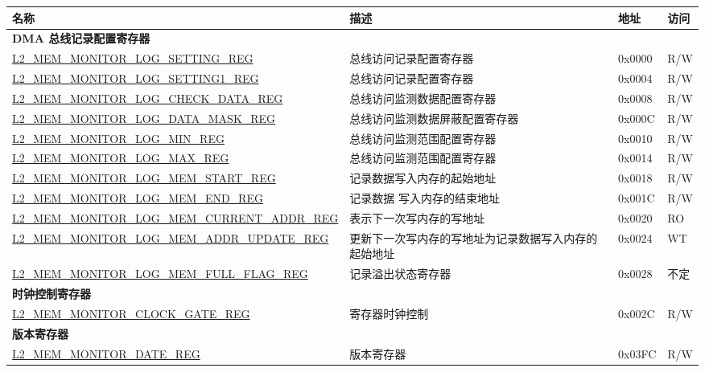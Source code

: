 \begin{longtable}{ | l| m{5cm} | l | l | }
\hline\rowcolor{lightgray}
{\bfseries 名称} & {\bfseries 描述} &  {\bfseries 地址} & {\bfseries 访问} \\ \hline
\endhead
\multicolumn{4}{|l|}{\textbf{DMA 总线记录配置寄存器}} \\ \hline
\hyperref[regdesc:L2MEMMONITORLOGSETTINGREG]{L2\_MEM\_MONITOR\_LOG\_SETTING\_REG} & 总线访问记录配置寄存器 & 0x0000 & R/W \\ \hline
\hyperref[regdesc:L2MEMMONITORLOGSETTING1REG]{L2\_MEM\_MONITOR\_LOG\_SETTING1\_REG} & 总线访问记录配置寄存器 & 0x0004 & R/W \\ \hline
\hyperref[regdesc:L2MEMMONITORLOGCHECKDATAREG]{L2\_MEM\_MONITOR\_LOG\_CHECK\_DATA\_REG} & 总线访问监测数据配置寄存器 & 0x0008 & R/W \\ \hline
\hyperref[regdesc:L2MEMMONITORLOGDATAMASKREG]{L2\_MEM\_MONITOR\_LOG\_DATA\_MASK\_REG} & 总线访问监测数据屏蔽配置寄存器 & 0x000C & R/W \\ \hline
\hyperref[regdesc:L2MEMMONITORLOGMINREG]{L2\_MEM\_MONITOR\_LOG\_MIN\_REG} & 总线访问监测范围配置寄存器 & 0x0010 & R/W \\ \hline
\hyperref[regdesc:L2MEMMONITORLOGMAXREG]{L2\_MEM\_MONITOR\_LOG\_MAX\_REG} & 总线访问监测范围配置寄存器 & 0x0014 & R/W \\ \hline
\hyperref[regdesc:L2MEMMONITORLOGMEMSTARTREG]{L2\_MEM\_MONITOR\_LOG\_MEM\_START\_REG} & 记录数据写入内存的起始地址 & 0x0018 & R/W \\ \hline
\hyperref[regdesc:L2MEMMONITORLOGMEMENDREG]{L2\_MEM\_MONITOR\_LOG\_MEM\_END\_REG} & 记录数据 写入内存的结束地址 & 0x001C & R/W \\ \hline
\hyperref[regdesc:L2MEMMONITORLOGMEMCURRENTADDRREG]{L2\_MEM\_MONITOR\_LOG\_MEM\_CURRENT\_ADDR\_REG} & 表示下一次写内存的写地址 & 0x0020 & RO \\ \hline
\hyperref[regdesc:L2MEMMONITORLOGMEMADDRUPDATEREG]{L2\_MEM\_MONITOR\_LOG\_MEM\_ADDR\_UPDATE\_REG} & 更新下一次写内存的写地址为记录数据写入内存的起始地址 & 0x0024 & WT \\ \hline
\hyperref[regdesc:L2MEMMONITORLOGMEMFULLFLAGREG]{L2\_MEM\_MONITOR\_LOG\_MEM\_FULL\_FLAG\_REG} & 记录溢出状态寄存器 & 0x0028 & 不定 \\ \hline
\multicolumn{4}{|l|}{\textbf{时钟控制寄存器}} \\ \hline
\hyperref[regdesc:L2MEMMONITORCLOCKGATEREG]{L2\_MEM\_MONITOR\_CLOCK\_GATE\_REG} & 寄存器时钟控制 & 0x002C & R/W \\ \hline
\multicolumn{4}{|l|}{\textbf{版本寄存器}} \\ \hline
\hyperref[regdesc:L2MEMMONITORDATEREG]{L2\_MEM\_MONITOR\_DATE\_REG} & 版本寄存器 & 0x03FC & R/W \\ \hline
\end{longtable}

